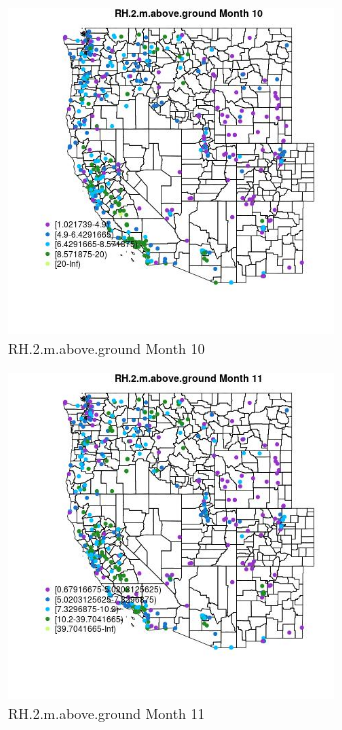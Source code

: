 \begin{figure} 
\centering  
\includegraphics[width=0.77\textwidth]{Code_Outputs/ML_input_report_ML_input_PM25_Step5_part_d_de_duplicated_aves_ML_input_MapObsMo10RH2maboveground.jpg} 
\caption{\label{fig:ML_input_report_ML_input_PM25_Step5_part_d_de_duplicated_aves_ML_inputMapObsMo10RH2maboveground}RH.2.m.above.ground Month 10} 
\end{figure} 
 

\begin{figure} 
\centering  
\includegraphics[width=0.77\textwidth]{Code_Outputs/ML_input_report_ML_input_PM25_Step5_part_d_de_duplicated_aves_ML_input_MapObsMo11RH2maboveground.jpg} 
\caption{\label{fig:ML_input_report_ML_input_PM25_Step5_part_d_de_duplicated_aves_ML_inputMapObsMo11RH2maboveground}RH.2.m.above.ground Month 11} 
\end{figure} 
 

